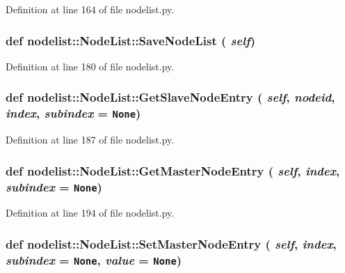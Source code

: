 Definition at line 164 of file nodelist.py.\hypertarget{classnodelist_1_1NodeList_b68284c7742c05364af484bbc0b162e6}{
\subsubsection[SaveNodeList]{\setlength{\rightskip}{0pt plus 5cm}def nodelist::Node\-List::Save\-Node\-List ( {\em self})}}
\label{classnodelist_1_1NodeList_b68284c7742c05364af484bbc0b162e6}




Definition at line 180 of file nodelist.py.\hypertarget{classnodelist_1_1NodeList_305f512d69651d134aaa585e4aed94b8}{
\subsubsection[GetSlaveNodeEntry]{\setlength{\rightskip}{0pt plus 5cm}def nodelist::Node\-List::Get\-Slave\-Node\-Entry ( {\em self},  {\em nodeid},  {\em index},  {\em subindex} = {\tt None})}}
\label{classnodelist_1_1NodeList_305f512d69651d134aaa585e4aed94b8}




Definition at line 187 of file nodelist.py.\hypertarget{classnodelist_1_1NodeList_d3fd973b32423384bc36ddb0cb54c632}{
\subsubsection[GetMasterNodeEntry]{\setlength{\rightskip}{0pt plus 5cm}def nodelist::Node\-List::Get\-Master\-Node\-Entry ( {\em self},  {\em index},  {\em subindex} = {\tt None})}}
\label{classnodelist_1_1NodeList_d3fd973b32423384bc36ddb0cb54c632}




Definition at line 194 of file nodelist.py.\hypertarget{classnodelist_1_1NodeList_cc92822b3c2879ac7df9d0b2f39d4647}{
\subsubsection[SetMasterNodeEntry]{\setlength{\rightskip}{0pt plus 5cm}def nodelist::Node\-List::Set\-Master\-Node\-Entry ( {\em self},  {\em index},  {\em subindex} = {\tt None},  {\em value} = {\tt None})}}
\label{classnodelist_1_1NodeList_cc92822b3c2879ac7df9d0b2f39d4647}




